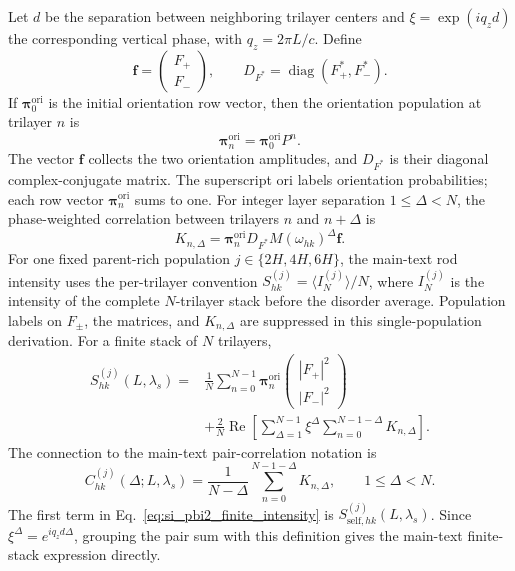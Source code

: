 Let $d$ be the separation between neighboring trilayer centers and
$\xi=\exp(iq_zd)$ the corresponding vertical phase, with $q_z=2\pi L/c$.  Define
\begin{equation}
 \mathbf f=\begin{pmatrix}F_+\\F_-\end{pmatrix},\qquad
 D_{F^*}=\operatorname{diag}(F_+^*,F_-^*).
 \label{eq:si_pbi2_form_vector}
\end{equation}
If $\boldsymbol{\pi}^{\mathrm{ori}}_0$ is the initial orientation row vector,
then the orientation population at trilayer $n$ is
\begin{equation}
 \boldsymbol{\pi}^{\mathrm{ori}}_n
 =\boldsymbol{\pi}^{\mathrm{ori}}_0P^n.
 \label{eq:si_pbi2_orientation_population}
\end{equation}
The vector $\mathbf f$ collects the two orientation amplitudes, and $D_{F^*}$ is their diagonal complex-conjugate matrix. The superscript $\mathrm{ori}$ labels orientation probabilities; each row vector $\boldsymbol{\pi}^{\mathrm{ori}}_n$ sums to one. For integer layer separation $1\leq\Delta<N$, the phase-weighted correlation between trilayers $n$ and $n+\Delta$ is
\begin{equation}
 K_{n,\Delta}=\boldsymbol{\pi}^{\mathrm{ori}}_n
 D_{F^*}M(\omega_{hk})^\Delta\mathbf f.
 \label{eq:si_pbi2_pair_kernel}
\end{equation}
For one fixed parent-rich population $j\in\{2H,4H,6H\}$, the main-text rod intensity uses the per-trilayer convention $S_{hk}^{(j)}=\langle I_N^{(j)}\rangle/N$, where $I_N^{(j)}$ is the intensity of the complete $N$-trilayer stack before the disorder average. Population labels on $F_\pm$, the matrices, and $K_{n,\Delta}$ are suppressed in this single-population derivation. For a finite stack of $N$ trilayers,
\begin{align}
 S_{hk}^{(j)}(L,\lambda_s)={}&
 \frac{1}{N}\sum_{n=0}^{N-1}
 \boldsymbol{\pi}^{\mathrm{ori}}_n
 \begin{pmatrix}|F_+|^2\\|F_-|^2\end{pmatrix}
 \nonumber\\
 &+\frac{2}{N}\operatorname{Re}\!\left[
 \sum_{\Delta=1}^{N-1}\xi^\Delta
 \sum_{n=0}^{N-1-\Delta}K_{n,\Delta}\right].
 \label{eq:si_pbi2_finite_intensity}
\end{align}
The connection to the main-text pair-correlation notation is
\begin{equation}
 C_{hk}^{(j)}(\Delta;L,\lambda_s)
 =\frac{1}{N-\Delta}\sum_{n=0}^{N-1-\Delta}K_{n,\Delta},
 \qquad 1\leq\Delta<N.
 \label{eq:si_pbi2_main_correlation}
\end{equation}
The first term in Eq.~\eqref{eq:si_pbi2_finite_intensity} is $S_{\mathrm{self},hk}^{(j)}(L,\lambda_s)$. Since $\xi^\Delta=e^{iq_zd\Delta}$, grouping the pair sum with this definition gives the main-text finite-stack expression directly.

